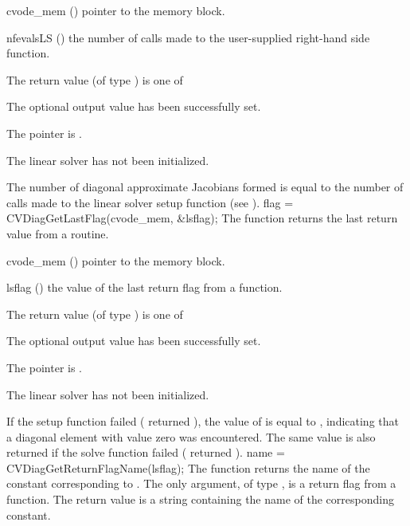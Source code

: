 {
  \begin{args}
  \item[cvode\_mem] ()
    pointer to the {\cvodes} memory block.
  \item[nfevalsLS] ()
    the number of calls made to the user-supplied right-hand side function.
  \end{args}
}
{
  The return value  (of type ) is one of
  \begin{args}
  \item[\Id{CVDIAG\_SUCCESS}] 
    The optional output value has been successfully set.
  \item[\Id{CVDIAG\_MEM\_NULL}]
    The  pointer is .
  \item[\Id{CVDIAG\_LMEM\_NULL}]
    The {\cvdiag} linear solver has not been initialized.
  \end{args}
}
{
  The number of diagonal approximate Jacobians formed is
  equal to the number of calls made to the linear solver setup function
  (see ).
}
{
  flag = CVDiagGetLastFlag(cvode\_mem, \&lsflag);
}
{
  The function  returns the
  last return value from a {\cvdiag} routine. 
}
{
  \begin{args}
  \item[cvode\_mem] ()
    pointer to the {\cvodes} memory block.
  \item[lsflag] ()
    the value of the last return flag from a {\cvdiag} function.
  \end{args}
}
{
  The return value  (of type ) is one of
  \begin{args}
  \item[\Id{CVDIAG\_SUCCESS}] 
    The optional output value has been successfully set.
  \item[\Id{CVDIAG\_MEM\_NULL}]
    The  pointer is .
  \item[\Id{CVDIAG\_LMEM\_NULL}]
    The {\cvdiag} linear solver has not been initialized.
  \end{args}
}
{
  If the {\cvdiag} setup function failed ( returned ),
  the value of  is equal to , indicating that a
  diagonal element with value zero was encountered.
  The same value is also returned if the {\cvdiag} solve function failed
  ( returned ).
}
{
  name = CVDiagGetReturnFlagName(lsflag);
}
{
  The function  returns the
  name of the {\cvdiag} constant corresponding to .
}
{
  The only argument, of type , is a return flag from a {\cvdiag} function.
}
{
  The return value is a string containing the name of the corresponding constant.
}
{}


